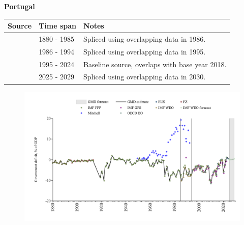 \documentclass[12pt,a4paper,landscape]{article}
\begin{document}
\begin{adjustbox}{max totalsize={\paperwidth}{\paperheight},center}
\begin{minipage}[t][\textheight][t]{\textwidth}
\vspace*{0.5cm}
{}
\begin{center}
{\Large\bfseries Portugal}
\end{center}
\vspace{0.5cm}
\begin{table}[H]
\centering
\small
\begin{tabular}{|l|l|l|}
\hline
\textbf{Source} & \textbf{Time span} & \textbf{Notes} \\
\hline
\rowcolor{white}\cite{IMF_FPP}& 1880 - 1985 &Spliced using overlapping data in 1986.\\
\rowcolor{lightgray}\cite{IMF_WEO}& 1986 - 1994 &Spliced using overlapping data in 1995.\\
\rowcolor{white}\cite{EUS}& 1995 - 2024 &Baseline source, overlaps with base year 2018.\\
\rowcolor{lightgray}\cite{IMF_WEO_forecast}& 2025 - 2029 &Spliced using overlapping data in 2030.\\
\hline
\end{tabular}
\end{table}
\begin{figure}[H]
\centering
\includegraphics[width=\textwidth,height=0.6\textheight,keepaspectratio]{graphs/PRT_govdef_GDP.pdf}
\end{figure}
\end{minipage}
\end{adjustbox}
\end{document}
